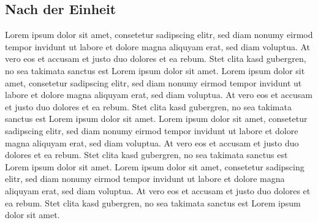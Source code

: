 \documentclass[a4paper,11pt]{scrartcl} %
\begin{document}
  \subsection{Nach der Einheit} %
Lorem ipsum dolor sit amet, consetetur sadipscing elitr, sed diam nonumy 
eirmod tempor invidunt ut labore et dolore magna aliquyam erat, sed diam 
voluptua. At vero eos et accusam et justo duo dolores et ea rebum. Stet 
clita kasd gubergren, no sea takimata sanctus est Lorem ipsum dolor sit 
amet. Lorem ipsum dolor sit amet, consetetur sadipscing elitr, sed diam 
nonumy eirmod tempor invidunt ut labore et dolore magna aliquyam erat, 
sed diam voluptua. At vero eos et accusam et justo duo dolores et ea rebum. 
Stet clita kasd gubergren, no sea takimata sanctus est Lorem ipsum dolor sit 
amet.
Lorem ipsum dolor sit amet, consetetur sadipscing elitr, sed diam nonumy 
eirmod tempor invidunt ut labore et dolore magna aliquyam erat, sed diam 
voluptua. At vero eos et accusam et justo duo dolores et ea rebum. Stet 
clita kasd gubergren, no sea takimata sanctus est Lorem ipsum dolor sit 
amet. Lorem ipsum dolor sit amet, consetetur sadipscing elitr, sed diam 
nonumy eirmod tempor invidunt ut labore et dolore magna aliquyam erat, 
sed diam voluptua. At vero eos et accusam et justo duo dolores et ea rebum. 
Stet clita kasd gubergren, no sea takimata sanctus est Lorem ipsum dolor sit 
amet.
\end{document}

